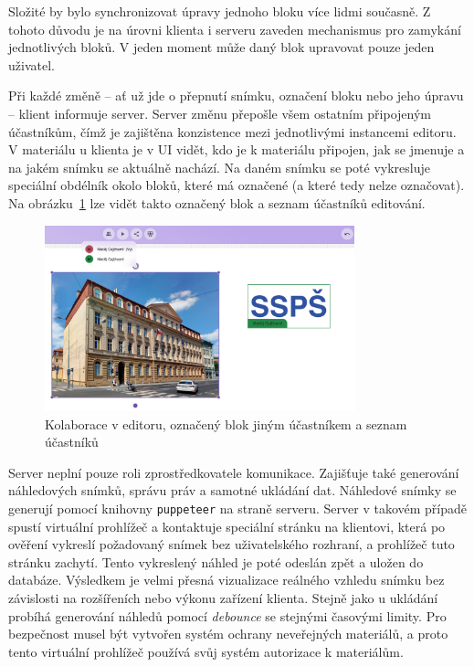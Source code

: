 Složité by bylo synchronizovat úpravy jednoho bloku více lidmi současně.
Z tohoto důvodu je na úrovni klienta i serveru zaveden mechanismus pro zamykání jednotlivých bloků.
V jeden moment může daný blok upravovat pouze jeden uživatel.

Při každé změně -- ať už jde o přepnutí snímku, označení bloku nebo jeho úpravu -- klient informuje server. 
Server změnu přepošle všem ostatním připojeným účastníkům, čímž je zajištěna konzistence mezi jednotlivými instancemi editoru.
V materiálu u klienta je v UI vidět, kdo je k materiálu připojen, jak se jmenuje a na jakém snímku se aktuálně nachází.
Na daném snímku se poté vykresluje speciální obdélník okolo bloků, které má označené (a které tedy nelze označovat).
Na obrázku~\ref{fig:realizace/kolaborace} lze vidět takto označený blok a seznam účastníků editování.



\begin{figure}[ht!]
    \centering
    \includegraphics[width=0.8\textwidth]{media/05_realizace/kolaborace.png}
    \caption{Kolaborace v editoru, označený blok jiným účastníkem a seznam účastníků}
    \label{fig:realizace/kolaborace}
\end{figure}


Server neplní pouze roli zprostředkovatele komunikace. 
Zajišťuje také generování náhledových snímků, správu práv a samotné ukládání dat.
Náhledové snímky se generují pomocí knihovny \texttt{puppeteer} na straně serveru. 
Server v takovém případě spustí virtuální prohlížeč a kontaktuje speciální stránku na klientovi, která po ověření vykreslí požadovaný snímek bez uživatelského rozhraní, a prohlížeč tuto stránku zachytí. 
Tento vykreslený náhled je poté odeslán zpět a uložen do databáze. 
Výsledkem je velmi přesná vizualizace reálného vzhledu snímku bez závislosti na rozšířeních nebo výkonu zařízení klienta.
Stejně jako u ukládání probíhá generování náhledů pomocí \textit{debounce} se stejnými časovými limity.
Pro bezpečnost musel být vytvořen systém ochrany neveřejných materiálů, a proto tento virtuální prohlížeč používá svůj systém autorizace k materiálům.

